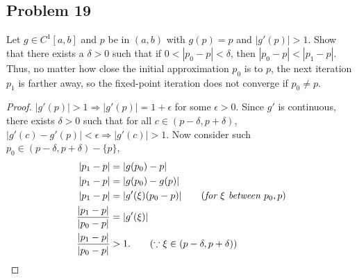\documentclass{article}
\begin{document}
\subsection*{Problem 19}
Let $g\in C^1[a,b]$ and $p$ be in $(a,b)$ with $g(p)=p$ and $|g'(p)|>1$. Show that there exists a 
$\delta > 0$ such that if $0<|p_0-p|<\delta$, then $|p_0-p|<|p_1-p|$. Thus, no matter how close the 
initial approximation $p_0$ is to $p$, the next iteration $p_1$ is farther away, so the fixed-point 
iteration does not converge if $p_0\neq p$.
\begin{proof}
    $|g'(p)|>1\Rightarrow |g'(p)| = 1 + \epsilon$ for some $\epsilon>0$. Since $g'$ is continuous, 
    there exists $\delta > 0$ such that for all $c\in(p-\delta,p+\delta)$, $|g'(c) - g'(p)| < 
    \epsilon\Rightarrow |g'(c)| > 1$. Now consider such $p_0\in(p-\delta, p+\delta)-\{p\}$,
    \begin{align*}
        |p_1-p| & = |g(p_0)-p| \\
        |p_1-p| & = |g(p_0)-g(p)| \\
        |p_1-p| & = |g'(\xi)(p_0 - p)| \qquad (\emph{for $\xi$ between }p_0, p) \\
        \frac{|p_1-p|}{|p_0-p|} & = |g'(\xi)| \\ 
        \frac{|p_1-p|}{|p_0-p|} & > 1. \qquad (\because \xi \in (p-\delta, p+\delta))
    \end{align*}
    
\end{proof}
\end{document}
